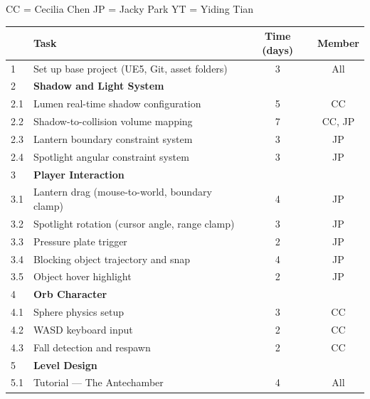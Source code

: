 \documentclass[11pt, letterpaper]{article}
\begin{document}
    \noindent CC = Cecilia Chen \quad JP = Jacky Park \quad YT = Yiding Tian

    \medskip
    \begin{center}
    \begin{tabular}{p{0.7cm} p{7.2cm} c c}
    \hline
     & \textbf{Task} & \textbf{Time (days)} & \textbf{Member} \\
    \hline
    1   & Set up base project (UE5, Git, asset folders)      & 3  & All    \\
    \hline
    2   & \textbf{Shadow and Light System}                   &    &        \\
    \hline
    2.1 & Lumen real-time shadow configuration               & 5  & CC     \\
    2.2 & Shadow-to-collision volume mapping                 & 7  & CC, JP \\
    2.3 & Lantern boundary constraint system                 & 3  & JP     \\
    2.4 & Spotlight angular constraint system                & 3  & JP     \\
    \hline
    3   & \textbf{Player Interaction}                        &    &        \\
    \hline
    3.1 & Lantern drag (mouse-to-world, boundary clamp)      & 4  & JP     \\
    3.2 & Spotlight rotation (cursor angle, range clamp)     & 3  & JP     \\
    3.3 & Pressure plate trigger                             & 2  & JP     \\
    3.4 & Blocking object trajectory and snap                & 4  & JP     \\
    3.5 & Object hover highlight                             & 2  & JP     \\
    \hline
    4   & \textbf{Orb Character}                             &    &        \\
    \hline
    4.1 & Sphere physics setup                               & 3  & CC     \\
    4.2 & WASD keyboard input                                & 2  & CC     \\
    4.3 & Fall detection and respawn                         & 2  & CC     \\
    \hline
    5   & \textbf{Level Design}                              &    &        \\
    \hline
    5.1 & Tutorial --- The Antechamber                       & 4  & All     \\

\end{tabular}
\end{center}
\end{document}
